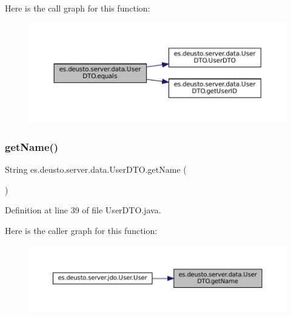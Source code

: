Here is the call graph for this function\+:
\nopagebreak
\begin{figure}[H]
\begin{center}
\leavevmode
\includegraphics[width=350pt]{classes_1_1deusto_1_1server_1_1data_1_1_user_d_t_o_a2963ea7c4e6ae150e958abc1f0ce2bbb_cgraph}
\end{center}
\end{figure}
\mbox{\label{classes_1_1deusto_1_1server_1_1data_1_1_user_d_t_o_a3e5416e48bbbd923f0d23b87f02e3aaf}} 
\subsubsection{\texorpdfstring{getName()}{getName()}}
{\footnotesize\ttfamily String es.\+deusto.\+server.\+data.\+User\+D\+T\+O.\+get\+Name (\begin{DoxyParamCaption}{ }\end{DoxyParamCaption})}



Definition at line 39 of file User\+D\+T\+O.\+java.

Here is the caller graph for this function\+:
\nopagebreak
\begin{figure}[H]
\begin{center}
\leavevmode
\includegraphics[width=350pt]{classes_1_1deusto_1_1server_1_1data_1_1_user_d_t_o_a3e5416e48bbbd923f0d23b87f02e3aaf_icgraph}
\end{center}
\end{figure}
\mbox{\label{classes_1_1deusto_1_1server_1_1data_1_1_user_d_t_o_a4e7fdc51138f595198b84687dadd3388}} 
